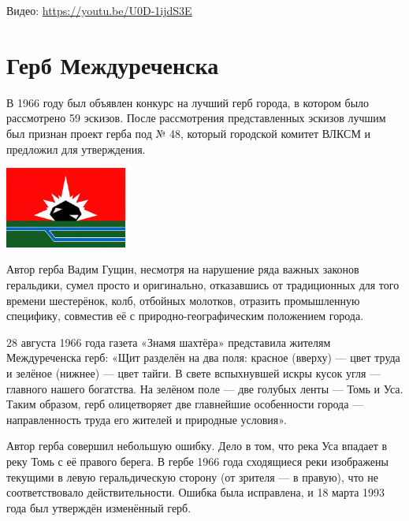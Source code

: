 Видео: \url{https://youtu.be/U0D-1ijdS3E}





\section{Герб Междуреченска}
В 1966 году был объявлен конкурс на лучший герб города, в котором было рассмотрено 59 эскизов. После рассмотрения представленных эскизов лучшим был признан проект герба под № 48, который городской комитет ВЛКСМ и предложил для утверждения.

\includegraphics[width=0.3\textwidth]{img/Flag_of_Mezhdurechensk_(Kemerovo_oblast).png}

Автор герба Вадим Гущин, несмотря на нарушение ряда важных законов геральдики, сумел просто и оригинально, отказавшись от традиционных для того времени шестерёнок, колб, отбойных молотков, отразить промышленную специфику, совместив её с природно-географическим положением города.

28 августа 1966 года газета «Знамя шахтёра» представила жителям Междуреченска герб: «Щит разделён на два поля: красное (вверху) — цвет труда и зелёное (нижнее) — цвет тайги. В свете вспыхнувшей искры кусок угля — главного нашего богатства. На зелёном поле — две голубых ленты — Томь и Уса. Таким образом, герб олицетворяет две главнейшие особенности города — направленность труда его жителей и природные условия».

Автор герба совершил небольшую ошибку. Дело в том, что река Уса впадает в реку Томь с её правого берега. В гербе 1966 года сходящиеся реки изображены текущими в левую геральдическую сторону (от зрителя — в правую), что не соответствовало действительности. Ошибка была исправлена, и 18 марта 1993 года был утверждён изменённый герб.
